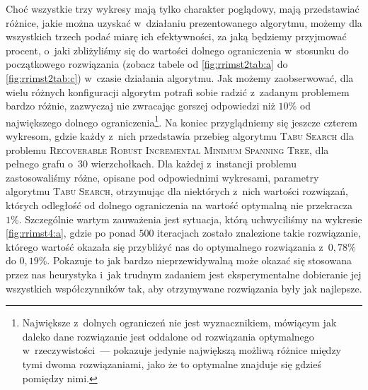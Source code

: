 Choć wszystkie trzy wykresy mają tylko charakter poglądowy, mają przedstawiać różnice, jakie można uzyskać w~działaniu prezentowanego algorytmu, możemy dla wszystkich trzech podać miarę ich efektywności, za jaką będziemy przyjmować procent, o~jaki zbliżyliśmy się do wartości dolnego ograniczenia w~stosunku do początkowego rozwiązania (zobacz tabele od \ref{fig:rrimst2tab:a} do \ref{fig:rrimst2tab:c}) w~czasie działania algorytmu.
Jak możemy zaobserwować, dla wielu różnych konfiguracji algorytm potrafi sobie radzić z~zadanym problemem bardzo różnie, zazwyczaj nie zwracając gorszej odpowiedzi niż $10\%$ od największego dolnego ograniczenia\footnote{
	Największe z~dolnych ograniczeń nie jest wyznacznikiem, mówiącym jak daleko dane rozwiązanie jest oddalone od rozwiązania optymalnego w~rzeczywistości~--- pokazuje jedynie największą możliwą różnice między tymi dwoma rozwiązaniami, jako że to optymalne znajduje się gdzieś pomiędzy nimi.
}.
Na koniec przyglądniemy się jeszcze czterem wykresom, gdzie każdy z~nich przedstawia przebieg algorytmu \textsc{Tabu Search} dla problemu \textsc{Recoverable Robust Incremental Minimum Spanning Tree}, dla pełnego grafu o~$30$ wierzchołkach.
Dla każdej z~instancji problemu zastosowaliśmy różne, opisane pod odpowiednimi wykresami, parametry algorytmu \textsc{Tabu Search}, otrzymując dla niektórych z~nich wartości rozwiązań, których odległość od dolnego ograniczenia na wartość optymalną nie przekracza $1\%$.
Szczególnie wartym zauważenia jest sytuacja, którą uchwyciliśmy na wykresie \ref{fig:rrimst4:a}, gdzie po ponad $500$ iteracjach zostało znalezione takie rozwiązanie, którego wartość okazała się przybliżyć nas do optymalnego rozwiązania z~$0,78\%$ do $0,19\%$.
Pokazuje to jak bardzo nieprzewidywalną może okazać się stosowana przez nas heurystyka i~jak trudnym zadaniem jest eksperymentalne dobieranie jej wszystkich współczynników tak, aby otrzymywane rozwiązania były jak najlepsze.

